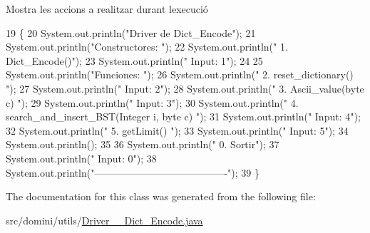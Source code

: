 Mostra les accions a realitzar durant l\textquotesingle{}execució 


\begin{DoxyCode}
19                                      \{
20         System.out.println(\textcolor{stringliteral}{"Driver de Dict\_Encode"});
21         System.out.println(\textcolor{stringliteral}{"Constructores: "});
22         System.out.println(\textcolor{stringliteral}{"     1. Dict\_Encode()"});
23         System.out.println(\textcolor{stringliteral}{"     Input: 1"});
24 
25         System.out.println(\textcolor{stringliteral}{"Funciones: "});
26         System.out.println(\textcolor{stringliteral}{"     2. reset\_dictionary() "});
27         System.out.println(\textcolor{stringliteral}{"     Input: 2"});
28         System.out.println(\textcolor{stringliteral}{"     3. Ascii\_value(byte c) "});
29         System.out.println(\textcolor{stringliteral}{"     Input: 3"});
30         System.out.println(\textcolor{stringliteral}{"     4. search\_and\_insert\_BST(Integer i, byte c) "});
31         System.out.println(\textcolor{stringliteral}{"     Input: 4"});
32         System.out.println(\textcolor{stringliteral}{"     5. getLimit() "});
33         System.out.println(\textcolor{stringliteral}{"     Input: 5"});
34         System.out.println();
35 
36         System.out.println(\textcolor{stringliteral}{"     0. Sortir"});
37         System.out.println(\textcolor{stringliteral}{"     Input: 0"});
38         System.out.println(\textcolor{stringliteral}{"----------------------------------------"});
39     \}
\end{DoxyCode}


The documentation for this class was generated from the following file\+:\begin{DoxyCompactItemize}
\item 
src/domini/utils/\hyperlink{Driver____Dict__Encode_8java}{Driver\+\_\+\+\_\+\+Dict\+\_\+\+Encode.\+java}\end{DoxyCompactItemize}
